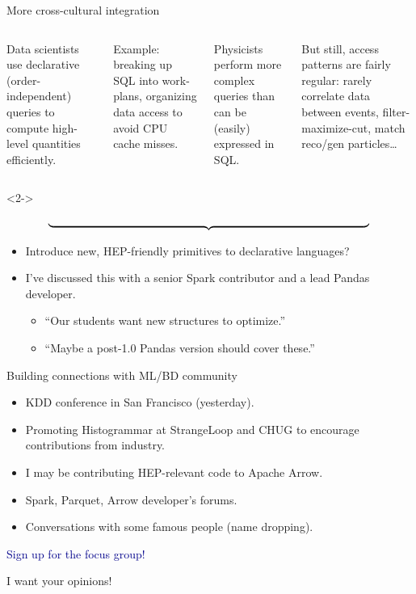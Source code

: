 \documentclass{beamer}
\begin{document}
\begin{frame}{More cross-cultural integration}
\vspace{0.5 cm}
\begin{columns}
Data scientists use declarative (order-independent) queries to compute high-level quantities efficiently.

\vspace{0.25 cm}
Example: breaking up SQL into work-plans, organizing data access to avoid CPU cache misses.

Physicists perform more complex queries than can be (easily) expressed in SQL.

\vspace{0.25 cm}
But still, access patterns are fairly regular: rarely correlate data between events, filter-maximize-cut, match reco/gen particles\ldots
\end{columns}

\begin{uncoverenv}<2->
\vspace{-0.5 cm}
\[ \underbrace{\mbox{\hspace{10 cm}}}{} \]

\begin{itemize}
\item Introduce new, HEP-friendly primitives to declarative languages?
\item I've discussed this with a senior Spark contributor and a lead Pandas developer.
\begin{itemize}
\item ``Our students want new structures to optimize.''
\item ``Maybe a post-1.0 Pandas version should cover these.''
\end{itemize}
\end{itemize}
\end{uncoverenv}
\end{frame}

\begin{frame}{Building connections with ML/BD community}

\begin{itemize}\setlength{\itemsep}{0.5 cm}
\item KDD conference in San Francisco (yesterday).
\item Promoting Histogrammar at StrangeLoop and CHUG to encourage contributions from industry.
\item I may be contributing HEP-relevant code to Apache Arrow.
\item Spark, Parquet, Arrow developer's forums.
\item Conversations with some famous people (name dropping).
\end{itemize}
\end{frame}

\begin{frame}{}
\begin{center}
\textcolor{darkblue}{\Huge Sign up for the focus group!}

\vspace{1 cm}
\Large I want your opinions!
\end{center}
\end{frame}
\end{document}

